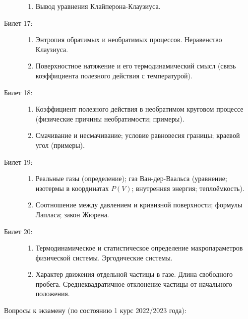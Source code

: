 \documentclass{article}
\begin{document}
\begin{description}
\begin{enumerate}
		\item Вывод уравнения Клайперона-Клаузиуса.
	\end{enumerate}
	\item[Билет 17:]\phantom{}
	\begin{enumerate}
		\item Энтропия обратимых и необратимых процессов.
		      Неравенство Клаузиуса.
		\item Поверхностное натяжение и его термодинамический смысл
		      (связь коэффициента полезного действия с температурой).
	\end{enumerate}
	\item[Билет 18:]\phantom{}
	\begin{enumerate}
		\item Коэффициент полезного действия в необратимом круговом процессе
		      (физические причины необратимости; примеры).
		\item Смачивание и несмачивание; условие равновесия границы;
		      краевой угол (примеры).
	\end{enumerate}
	\item[Билет 19:]\phantom{}
	\begin{enumerate}
		\item Реальные газы (определение); газ Ван-дер-Ваальса
		      (уравнение; изотермы в координатах $P(V)$; внутренняя энергия;
		      теплоёмкость).
		\item Соотношение между давлением и кривизной поверхности;
		      формулы Лапласа; закон Жюрена.
	\end{enumerate}
	\item[Билет 20:]\phantom{}
	\begin{enumerate}
		\item Термодинамическое и статистическое определение
		      макропараметров физической системы. Эргодические системы.
		\item Характер движения отдельной частицы в газе.
		      Длина свободного пробега. Среднеквадратичное отклонение
		      частицы от начального положения.
	\end{enumerate}
\end{description}
Вопросы к экзамену (по состоянию 1 курс 2022/2023 года):
\end{document}
